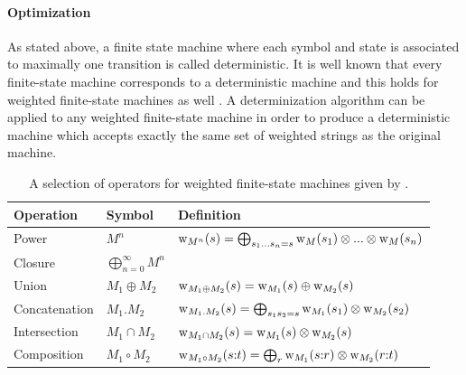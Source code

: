 \paragraph{Optimization} As stated above, a finite state machine where
each symbol and state is associated to maximally one transition is
called deterministic. It is well known that every finite-state machine
corresponds to a deterministic machine and this holds for weighted
finite-state machines as well \citep{Mohri2002}. A determinization
algorithm can be applied to any weighted finite-state machine in order
to produce a deterministic machine which accepts exactly the same set
of weighted strings as the original machine.

\begin{table}[!ftb]
\begin{center}
\begin{tabular}{lll}
Operation & Symbol & Definition \\
\hline
Power & $M^n$ & $\mbox{${\rm w}$}_{M^n}(s) = \bigoplus_{s_1 ... s_n = s} \mbox{${\rm w}$}_{M}(s_1) \otimes ... \otimes \mbox{${\rm w}$}_{M}(s_n)$\\ 
Closure & $\bigoplus_{n = 0}^\infty M^n$ &  \\
Union & $M_1 \oplus M_2$ & $\mbox{${\rm w}$}_{M_1 \oplus M_2}(s) = \mbox{${\rm w}$}_{M_1}(s) \oplus \mbox{${\rm w}$}_{M_2}(s)$\\ 
Concatenation & $M_1.M_2$ & $\mbox{${\rm w}$}_{M_1.M_2}(s) = \bigoplus_{s_1s_2 = s} \mbox{${\rm w}$}_{M_1}(s_1) \otimes \mbox{${\rm w}$}_{M_2}(s_2)$\\
Intersection & $M_1 \cap M_2$ & $\mbox{${\rm w}$}_{M_1 \cap M_2}(s) = \mbox{${\rm w}$}_{M_1}(s) \otimes \mbox{${\rm w}$}_{M_2}(s)$ \\
Composition & $M_1 \circ M_2$ & $\mbox{${\rm w}$}_{M_1 \circ M_2}(s{\rm :}t) = \bigoplus_{r} \mbox{${\rm w}$}_{M_1}(s{\rm :}r) \otimes \mbox{${\rm w}$}_{M_2}(r{\rm :}t)$\\
\end{tabular}
\caption{A selection of operators for weighted finite-state machines
  given by
  \cite{Allauzen2007}.}\label{tab:fs-algebra}
\end{center}
\end{table}


